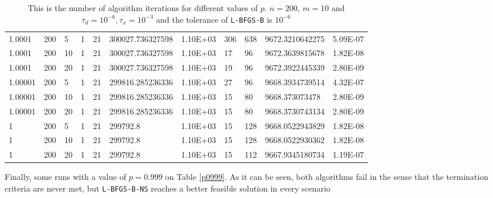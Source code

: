 \begin{table}
\begin{center}
\begin{tabular}{|l|l|l|l|l|l|l|l|l|l|l|}
      1.0001 & 200 & 5 &  1 & 21 & 300027.736327598 & 1.10E+03 & 306 & 638 & 9672.3210642275 & 5.09E-07\\
      1.0001 & 200 & 10 &  1 & 21 & 300027.736327598 & 1.10E+03 & 17 & 96 & 9672.3639815678 & 1.82E-08\\
      1.0001 & 200 & 20 &  1 & 21 & 300027.736327598 & 1.10E+03 & 19 & 96 & 9672.3922445339 & 2.80E-09\\
      1.00001 & 200 & 5 &  1 & 21 & 299816.285236336 & 1.10E+03 & 27 & 96 & 9668.3934739514 & 4.32E-07\\
      1.00001 & 200 & 10 &  1 & 21 & 299816.285236336 & 1.10E+03 & 15 & 80 & 9668.373073478 & 2.80E-09\\
      1.00001 & 200 & 20 &  1 & 21 & 299816.285236336 & 1.10E+03 & 15 & 80 & 9668.3730743134 & 2.80E-09\\
      1 & 200 & 5 & 1 &  21  & 299792.8 & 1.10E+03 & 15 & 128 & 9668.0522943829 & 1.82E-08\\
      1 & 200 & 10 & 1 &  21 & 299792.8 & 1.10E+03 & 15 & 128 & 9668.0522930362 & 1.82E-08\\
      1 & 200 & 20 & 1 &  21 & 299792.8 & 1.10E+03 & 15 & 112 & 9667.9345180734 & 1.19E-07\\
      \hline
    \end{tabular}
    \caption[Number of algorithm Iterations Changing $p$]{This is the number of algorithm iterations for different values of $p$. $n = 200$, $m = 10$ and $\tau_d = 10^{-6}, \tau_x = 10^{-3}$ and the tolerance of \texttt{L-BFGS-B} is $10^{-6}$ }
    \label{pmtable}
  \end{center}
\end{table}

Finally, some runs with a value of $p = 0.999$ on Table \ref{p0999}. As it can be seen, both algorithms fail in the sense that the termination criteria are never met, but \texttt{L-BFGS-B-NS} reaches a better feasible solution in every scenario

